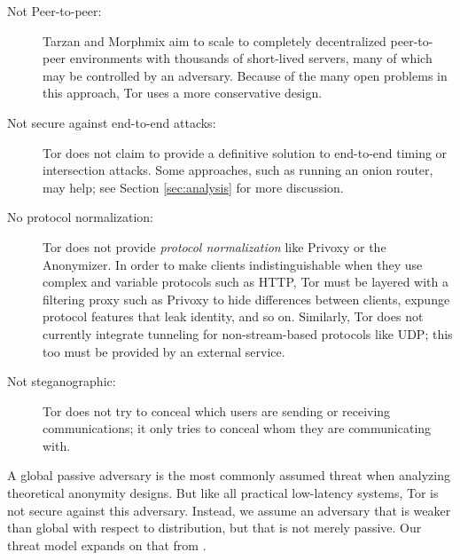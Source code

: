 \documentclass[times,10pt,twocolumn]{article}
\begin{document}
\begin{description}
\item[Not Peer-to-peer:] Tarzan and Morphmix aim to
  scale to completely decentralized peer-to-peer environments with thousands
  of short-lived servers, many of which may be controlled by an adversary.
  Because of the many open problems in this approach, Tor uses a more
  conservative design.
\item[Not secure against end-to-end attacks:] Tor does not claim to provide a
  definitive solution to end-to-end timing or intersection attacks. Some
  approaches, such as running an onion router, may help; see Section
  \ref{sec:analysis} for more discussion.
\item[No protocol normalization:] Tor does not provide \emph{protocol
  normalization} like Privoxy or the Anonymizer.  In order to make clients
  indistinguishable when they use complex and variable protocols such as HTTP,
  Tor must be layered with a filtering proxy such as Privoxy to hide
  differences between clients, expunge protocol features that leak identity,
  and so on.  Similarly, Tor does not currently integrate tunneling for
  non-stream-based protocols like UDP; this too must be provided by
  an external service.
\item[Not steganographic:] Tor does not try to conceal which users are
  sending or receiving communications; it only tries to conceal whom they are
  communicating with.
\end{description}

\label{subsec:threat-model}

A global passive adversary is the most commonly assumed threat when
analyzing theoretical anonymity designs. But like all practical low-latency
systems, Tor is not secure against this adversary.  Instead, we assume an
adversary that is weaker than global with respect to distribution, but that
is not merely passive.  Our threat model expands on that from
\cite{or-pet00}.
\end{document}
